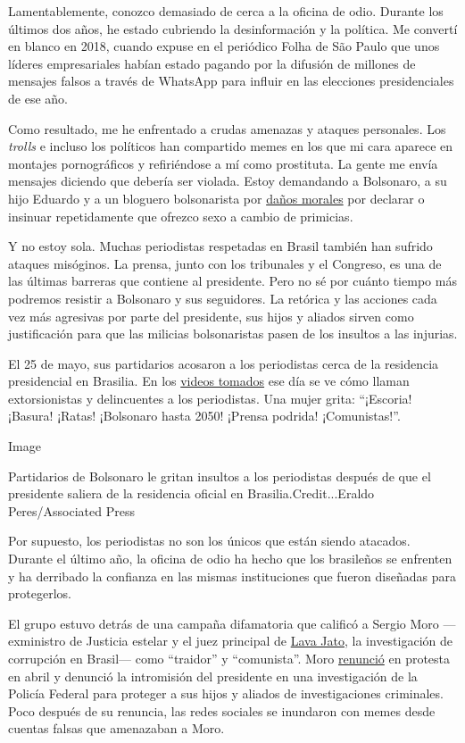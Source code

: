 Lamentablemente, conozco demasiado de cerca a la oficina de odio.
Durante los últimos dos años, he estado cubriendo la desinformación y la
política. Me convertí en blanco en 2018, cuando expuse en el periódico
Folha de São Paulo que unos líderes empresariales habían estado pagando
por la difusión de millones de mensajes falsos a través de WhatsApp para
influir en las elecciones presidenciales de ese año.

Como resultado, me he enfrentado a crudas amenazas y ataques personales.
Los \emph{trolls} e incluso los políticos han compartido memes en los
que mi cara aparece en montajes pornográficos y refiriéndose a mí como
prostituta. La gente me envía mensajes diciendo que debería ser violada.
Estoy demandando a Bolsonaro, a su hijo Eduardo y a un bloguero
bolsonarista por
\href{http://www.fundamedios.us/incidentes/patriciacampos-demanda-jairbolsonaro-ofensas-periodista/}{daños
morales} por declarar o insinuar repetidamente que ofrezco sexo a cambio
de primicias.

Y no estoy sola. Muchas periodistas respetadas en Brasil también han
sufrido ataques misóginos. La prensa, junto con los tribunales y el
Congreso, es una de las últimas barreras que contiene al presidente.
Pero no sé por cuánto tiempo más podremos resistir a Bolsonaro y sus
seguidores. La retórica y las acciones cada vez más agresivas por parte
del presidente, sus hijos y aliados sirven como justificación para que
las milicias bolsonaristas pasen de los insultos a las injurias.

El 25 de mayo, sus partidarios acosaron a los periodistas cerca de la
residencia presidencial en Brasilia. En los
\href{https://twitter.com/folha/status/1264913877399212034}{videos
tomados} ese día se ve cómo llaman extorsionistas y delincuentes a los
periodistas. Una mujer grita: ``¡Escoria! ¡Basura! ¡Ratas! ¡Bolsonaro
hasta 2050! ¡Prensa podrida! ¡Comunistas!''.

Image

Partidarios de Bolsonaro le gritan insultos a los periodistas después de
que el presidente saliera de la residencia oficial en
Brasilia.Credit...Eraldo Peres/Associated Press

Por supuesto, los periodistas no son los únicos que están siendo
atacados. Durante el último año, la oficina de odio ha hecho que los
brasileños se enfrenten y ha derribado la confianza en las mismas
instituciones que fueron diseñadas para protegerlos.

El grupo estuvo detrás de una campaña difamatoria que calificó a Sergio
Moro ---exministro de Justicia estelar y el juez principal de
\href{https://www.nytimes3xbfgragh.onion/2017/09/18/opinion/brazil-corruption-car-wash.html?searchResultPosition=1}{Lava
Jato}, la investigación de corrupción en Brasil--- como ``traidor'' y
``comunista''. Moro
\href{https://www.nytimes3xbfgragh.onion/2020/04/24/world/americas/brazil-bolsonaro-moro.html}{renunció}
en protesta en abril y denunció la intromisión del presidente en una
investigación de la Policía Federal para proteger a sus hijos y aliados
de investigaciones criminales. Poco después de su renuncia, las redes
sociales se inundaron con memes desde cuentas falsas que amenazaban a
Moro.

